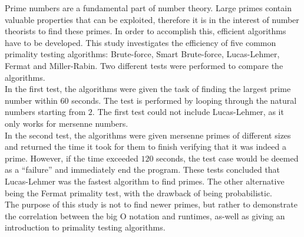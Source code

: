 \documentclass[main.tex]{subfiles}
\begin{document}
Prime numbers are a fundamental part of number theory. Large primes contain
valuable properties that can be exploited, therefore it is in the interest of
number theorists to find these primes. In order to accomplish this, efficient
algorithms have to be developed. This study investigates the efficiency of five
common primality testing algorithms: Brute-force, Smart Brute-force,
Lucas-Lehmer, Fermat and Miller-Rabin. Two different tests were performed to
compare the algorithms. \\

In the first test, the algorithms were given the task of finding the largest
prime number within $60$ seconds. The test is performed by looping through the
natural numbers starting from $2$. The first test could not include
Lucas-Lehmer, as it only works for mersenne numbers. \\

In the second test, the algorithms were given mersenne primes of different sizes
and returned the time it took for them to finish verifying that it was indeed a
prime. However, if the time exceeded $120$ seconds, the test case would be
deemed as a ``failure'' and immediately end the program. These tests concluded
that Lucas-Lehmer was the fastest algorithm to find primes. The other
alternative being the Fermat primality test, with the drawback of being probabilistic. \\

The purpose of this study is not to find newer primes, but rather to demonstrate
the correlation between the big O notation and runtimes, as-well as giving an
introduction to primality testing algorithms. \\
\end{document}
